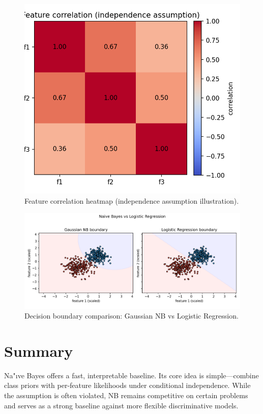 \documentclass[11pt]{article}
\begin{document}
\begin{figure}[H]
  \centering
  \includegraphics[width=0.9\linewidth]{feature_independence_heatmap.png}
  \caption{Feature correlation heatmap (independence assumption illustration).}
  \label{fig:heatmap}
\end{figure}
\FloatBarrier

\begin{figure}[H]
  \centering
  \includegraphics[width=0.95\linewidth]{gnb_vs_logreg_boundary.png}
  \caption{Decision boundary comparison: Gaussian NB vs Logistic Regression.}
  \label{fig:nb_vs_lr}
\end{figure}
\FloatBarrier

\section{Summary}
Na"\i ve Bayes offers a fast, interpretable baseline. Its core idea is simple---combine class priors with per-feature likelihoods under conditional independence. While the assumption is often violated, NB remains competitive on certain problems and serves as a strong baseline against more flexible discriminative models.
\end{document}
